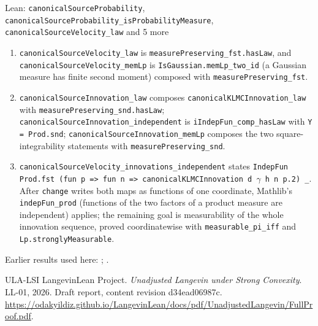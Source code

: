 \documentclass[11pt,a4paper]{article}
\begin{document}
\begin{leanbox}{Lean: \texttt{canonicalSourceProbability}, \texttt{canonicalSourceProbability\_\allowbreak{}isProbabilityMeasure}, \texttt{canonicalSourceVelocity\_\allowbreak{}law} and 5 more}
\begin{enumerate}
\item \texttt{canonical\allowbreak{}Source\allowbreak{}Velocity\_\allowbreak{}law} is \texttt{measure\allowbreak{}Preserving\_\allowbreak{}fst.\allowbreak{}has\allowbreak{}Law}, and \texttt{canonical\allowbreak{}Source\allowbreak{}Velocity\_\allowbreak{}mem\allowbreak{}Lp} is \texttt{Is\allowbreak{}Gaussian.\allowbreak{}mem\allowbreak{}Lp\_\allowbreak{}two\_\allowbreak{}id} (a Gaussian measure has finite second moment) composed with \texttt{measure\allowbreak{}Preserving\_\allowbreak{}fst}.

\item \texttt{canonical\allowbreak{}Source\allowbreak{}Innovation\_\allowbreak{}law} composes \texttt{canonical\allowbreak{}KLMCInnovation\_\allowbreak{}law} with \texttt{measure\allowbreak{}Preserving\_\allowbreak{}snd.\allowbreak{}has\allowbreak{}Law}; \texttt{canonical\allowbreak{}Source\allowbreak{}Innovation\_\allowbreak{}independent} is \texttt{i\allowbreak{}Indep\allowbreak{}Fun\_\allowbreak{}comp\_\allowbreak{}has\allowbreak{}Law} with \texttt{Y = Prod.\allowbreak{}snd}; \texttt{canonical\allowbreak{}Source\allowbreak{}Innovation\_\allowbreak{}mem\allowbreak{}Lp} composes the two square-integrability statements with \texttt{measure\allowbreak{}Preserving\_\allowbreak{}snd}.

\item \texttt{canonical\allowbreak{}Source\allowbreak{}Velocity\_\allowbreak{}innovations\_\allowbreak{}independent} states \texttt{Indep\allowbreak{}Fun Prod.\allowbreak{}fst (fun p => fun n => canonical\allowbreak{}KLMCInnovation d \ensuremath{\gamma} h n p.\allowbreak{}2) \_\allowbreak{}}. After \texttt{change} writes both maps as functions of one coordinate, Mathlib's \texttt{indep\allowbreak{}Fun\_\allowbreak{}prod} (functions of the two factors of a product measure are independent) applies; the remaining goal is measurability of the whole innovation sequence, proved coordinatewise with \texttt{measurable\_\allowbreak{}pi\_\allowbreak{}iff} and \texttt{Lp.\allowbreak{}strongly\allowbreak{}Measurable}.

\end{enumerate}
\end{leanbox}


Earlier results used here: \cite[Section~3.8.16]{LangevinLean2026ULASC}; \cite[Section~3.8.17]{LangevinLean2026ULASC}.

\begin{thebibliography}{ULA-LSI}
LangevinLean Project. \emph{Unadjusted Langevin under Strong Convexity}. LL-01, 2026. Draft report, content revision d34ead06987c. \url{https://odakyildiz.github.io/LangevinLean/docs/pdf/UnadjustedLangevin/FullProof.pdf}.
\end{thebibliography}
\end{document}
